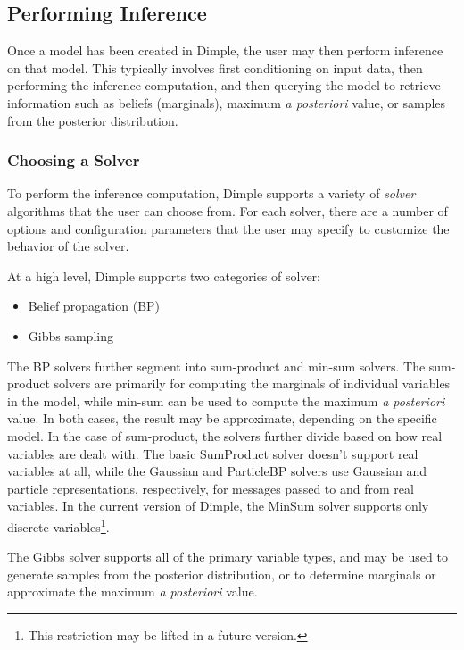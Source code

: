 \subsection{Performing Inference}

Once a model has been created in Dimple, the user may then perform inference on that model.  This typically involves first conditioning on input data, then performing the inference computation, and then querying the model to retrieve information such as beliefs (marginals), maximum \emph{a posteriori} value, or samples from the posterior distribution.

\subsubsection{Choosing a Solver}
\label{sec:Solvers}

To perform the inference computation, Dimple supports a variety of \emph{solver} algorithms that the user can choose from.  For each solver, there are a number of options and configuration parameters that the user may specify to customize the behavior of the solver.

At a high level, Dimple supports two categories of solver:
%
\begin{itemize}
\item Belief propagation (BP)
\item Gibbs sampling
\end{itemize}

The BP solvers further segment into sum-product and min-sum solvers.  The sum-product solvers are primarily for computing the marginals of individual variables in the model, while min-sum can be used to compute the maximum \emph{a posteriori} value.  In both cases, the result may be approximate, depending on the specific model.  In the case of sum-product, the solvers further divide based on how real variables are dealt with.  The basic SumProduct solver doesn't support real variables at all, while the Gaussian and ParticleBP solvers use Gaussian and particle representations, respectively, for messages passed to and from real variables.  In the current version of Dimple, the MinSum solver supports only discrete variables\footnote{This restriction may be lifted in a future version.}.

The Gibbs solver supports all of the primary variable types, and may be used to generate samples from the posterior distribution, or to determine marginals or approximate the maximum \emph{a posteriori} value.

